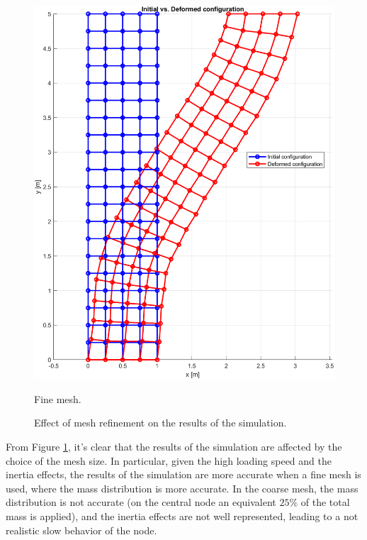 \begin{figure}[H]
\begin{minipage}[b]{0.45\textwidth}
        \includegraphics[width=\textwidth]{img/mesh_fine.png}
        \caption{Fine mesh.}
    \end{minipage}

    \caption{Effect of mesh refinement on the results of the simulation.}
    \label{fig:mesh_refinement}

\end{figure}

From Figure \ref{fig:mesh_refinement}, it's clear that the results of the simulation are affected by the choice of the mesh size.
In particular, given the high loading speed and the inertia effects, the results of the simulation are more accurate when a fine mesh is used, where the mass distribution is more accurate.
In the coarse mesh, the mass distribution is not accurate (on the central node an equivalent $25\%$ of the total mass is applied), and the inertia effects are not well represented, leading to a not realistic slow behavior of the node.
